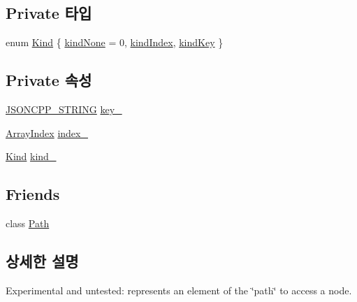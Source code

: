 \subsection*{Private 타입}
\begin{DoxyCompactItemize}
\item 
enum \hyperlink{class_json_1_1_path_argument_a2420bbad778573c147e578701b84d9b9}{Kind} \{ \hyperlink{class_json_1_1_path_argument_a2420bbad778573c147e578701b84d9b9afa8c7a261ccb8ae5171d2372321c2698}{kind\+None} = 0, 
\hyperlink{class_json_1_1_path_argument_a2420bbad778573c147e578701b84d9b9ae5a976b898111903334cb131f5e03dc4}{kind\+Index}, 
\hyperlink{class_json_1_1_path_argument_a2420bbad778573c147e578701b84d9b9a74f5968d06c01701b7a46092c33ba7d1}{kind\+Key}
 \}
\end{DoxyCompactItemize}
\subsection*{Private 속성}
\begin{DoxyCompactItemize}
\item 
\hyperlink{json_8h_a1e723f95759de062585bc4a8fd3fa4be}{J\+S\+O\+N\+C\+P\+P\+\_\+\+S\+T\+R\+I\+NG} \hyperlink{class_json_1_1_path_argument_af4024368548ff730ef2bed97d6f1ca43}{key\+\_\+}
\item 
\hyperlink{namespace_json_a8048e741f2177c3b5d9ede4a5b8c53c2}{Array\+Index} \hyperlink{class_json_1_1_path_argument_afd5857d1b6bfaae6961333bdae7bd5ec}{index\+\_\+}
\item 
\hyperlink{class_json_1_1_path_argument_a2420bbad778573c147e578701b84d9b9}{Kind} \hyperlink{class_json_1_1_path_argument_ad4bc4b544b155a3d9c7788572ecf991b}{kind\+\_\+}
\end{DoxyCompactItemize}
\subsection*{Friends}
\begin{DoxyCompactItemize}
\item 
class \hyperlink{class_json_1_1_path_argument_a4877239a6b7f09fbf5a61ca68a49d74c}{Path}
\end{DoxyCompactItemize}


\subsection{상세한 설명}
Experimental and untested\+: represents an element of the \char`\"{}path\char`\"{} to access a node. 

